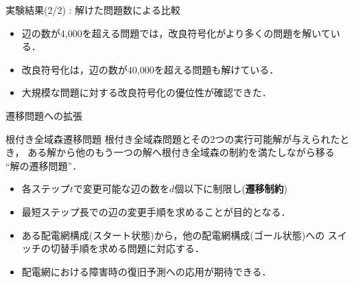 \documentclass[dvipdfmx,11pt]{beamer}
\begin{document}
\begin{frame}{実験結果(2/2) : 解けた問題数による比較}

\begin{table}[t]
 \centering
 
\end{table}\vfill

\begin{itemize}
\item 辺の数が4,000を超える問題では，改良符号化がより多くの問題を解いている．
\item 改良符号化は，辺の数が40,000を超える問題も解けている．
\item 大規模な問題に対する改良符号化の優位性が確認できた．
\end{itemize}
\end{frame}
\begin{frame}{遷移問題への拡張}

\begin{alertblock}{根付き全域森遷移問題}
  根付き全域森問題とその2つの実行可能解が与えられたとき，
  ある解から他のもう一つの解へ根付き全域森の制約を満たしながら移る
  ``解の遷移問題''．
  \begin{itemize}
  \item 各ステップ$t$で変更可能な辺の数を$d$個以下に制限し(\textbf{遷移制約})
  \item 最短ステップ長での辺の変更手順を求めることが目的となる．
  \end{itemize}
\end{alertblock}
\vfill  
\begin{itemize}
\item ある配電網構成(スタート状態)から，他の配電網構成(ゴール状態)への
  スイッチの切替手順を求める問題に対応する．
\item 配電網における障害時の復旧予測への応用が期待できる．
\end{itemize} 
\end{frame}
\end{document}
